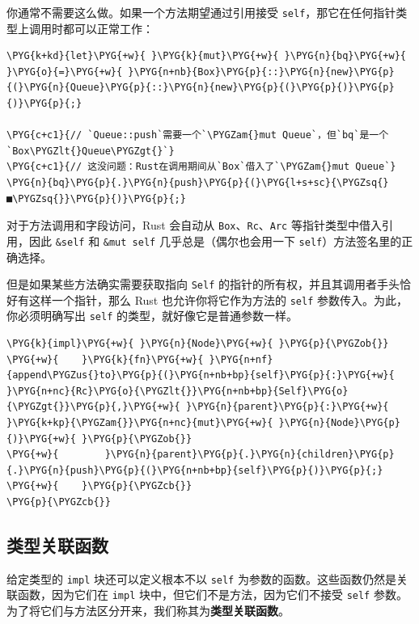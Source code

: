 你通常不需要这么做。如果一个方法期望通过引用接受 \texttt{self}，那它在任何指针类型上调用时都可以正常工作：

\begin{Verbatim}[commandchars=\\\{\},breaklines=true,breakanywhere=true,fontsize=\codefont,xleftmargin=17bp]
\PYG{k+kd}{let}\PYG{+w}{ }\PYG{k}{mut}\PYG{+w}{ }\PYG{n}{bq}\PYG{+w}{ }\PYG{o}{=}\PYG{+w}{ }\PYG{n+nb}{Box}\PYG{p}{::}\PYG{n}{new}\PYG{p}{(}\PYG{n}{Queue}\PYG{p}{::}\PYG{n}{new}\PYG{p}{(}\PYG{p}{)}\PYG{p}{)}\PYG{p}{;}

\PYG{c+c1}{// `Queue::push`需要一个`\PYGZam{}mut Queue`，但`bq`是一个`Box\PYGZlt{}Queue\PYGZgt{}`}
\PYG{c+c1}{// 这没问题：Rust在调用期间从`Box`借入了`\PYGZam{}mut Queue`}
\PYG{n}{bq}\PYG{p}{.}\PYG{n}{push}\PYG{p}{(}\PYG{l+s+sc}{\PYGZsq{}■\PYGZsq{}}\PYG{p}{)}\PYG{p}{;}
\end{Verbatim}

对于方法调用和字段访问，Rust 会自动从 \texttt{Box}、\texttt{Rc}、\texttt{Arc} 等指针类型中借入引用，因此 \texttt{\&self} 和 \texttt{\&mut self} 几乎总是（偶尔也会用一下 \texttt{self}）方法签名里的正确选择。

但是如果某些方法确实需要获取指向 \texttt{Self} 的指针的所有权，并且其调用者手头恰好有这样一个指针，那么 Rust 也允许你将它作为方法的 \texttt{self} 参数传入。为此，你必须明确写出 \texttt{self} 的类型，就好像它是普通参数一样。

\begin{Verbatim}[commandchars=\\\{\},breaklines=true,breakanywhere=true,fontsize=\codefont,xleftmargin=17bp]
\PYG{k}{impl}\PYG{+w}{ }\PYG{n}{Node}\PYG{+w}{ }\PYG{p}{\PYGZob{}}
\PYG{+w}{    }\PYG{k}{fn}\PYG{+w}{ }\PYG{n+nf}{append\PYGZus{}to}\PYG{p}{(}\PYG{n+nb+bp}{self}\PYG{p}{:}\PYG{+w}{ }\PYG{n+nc}{Rc}\PYG{o}{\PYGZlt{}}\PYG{n+nb+bp}{Self}\PYG{o}{\PYGZgt{}}\PYG{p}{,}\PYG{+w}{ }\PYG{n}{parent}\PYG{p}{:}\PYG{+w}{ }\PYG{k+kp}{\PYGZam{}}\PYG{n+nc}{mut}\PYG{+w}{ }\PYG{n}{Node}\PYG{p}{)}\PYG{+w}{ }\PYG{p}{\PYGZob{}}
\PYG{+w}{        }\PYG{n}{parent}\PYG{p}{.}\PYG{n}{children}\PYG{p}{.}\PYG{n}{push}\PYG{p}{(}\PYG{n+nb+bp}{self}\PYG{p}{)}\PYG{p}{;}
\PYG{+w}{    }\PYG{p}{\PYGZcb{}}
\PYG{p}{\PYGZcb{}}
\end{Verbatim}

\subsection{类型关联函数}

给定类型的 \texttt{impl} 块还可以定义根本不以 \texttt{self} 为参数的函数。这些函数仍然是关联函数，因为它们在 \texttt{impl} 块中，但它们不是方法，因为它们不接受 \texttt{self} 参数。为了将它们与方法区分开来，我们称其为\textbf{类型关联函数}。

